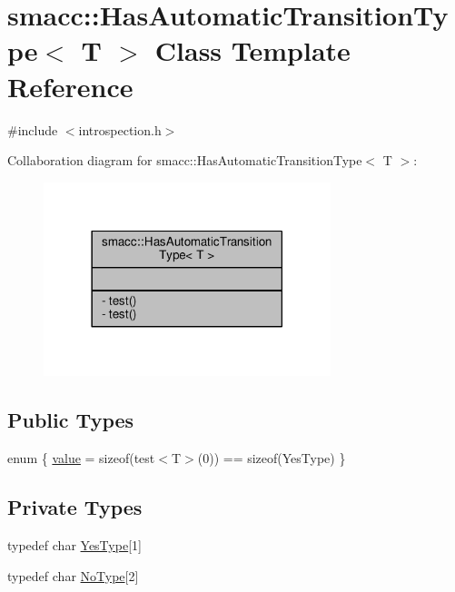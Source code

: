 \hypertarget{classsmacc_1_1HasAutomaticTransitionType}{}\section{smacc\+:\+:Has\+Automatic\+Transition\+Type$<$ T $>$ Class Template Reference}
\label{classsmacc_1_1HasAutomaticTransitionType}


{\ttfamily \#include $<$introspection.\+h$>$}



Collaboration diagram for smacc\+:\+:Has\+Automatic\+Transition\+Type$<$ T $>$\+:
\nopagebreak
\begin{figure}[H]
\begin{center}
\leavevmode
\includegraphics[width=237pt]{classsmacc_1_1HasAutomaticTransitionType__coll__graph}
\end{center}
\end{figure}
\subsection*{Public Types}
\begin{DoxyCompactItemize}
\item 
enum \{ \hyperlink{classsmacc_1_1HasAutomaticTransitionType_af7c2dd6009f2a3464a9b253b5eabe8e5ac3dba7514caf15e85491ccfd880b108b}{value} = sizeof(test$<$T$>$(0)) == sizeof(Yes\+Type)
 \}
\end{DoxyCompactItemize}
\subsection*{Private Types}
\begin{DoxyCompactItemize}
\item 
typedef char \hyperlink{classsmacc_1_1HasAutomaticTransitionType_a0261cbc759cb52b6f60495d327a088a4}{Yes\+Type}\mbox{[}1\mbox{]}
\item 
typedef char \hyperlink{classsmacc_1_1HasAutomaticTransitionType_a28c6f5359a0ce283d8f5705ed9fb0ceb}{No\+Type}\mbox{[}2\mbox{]}
\end{DoxyCompactItemize}

